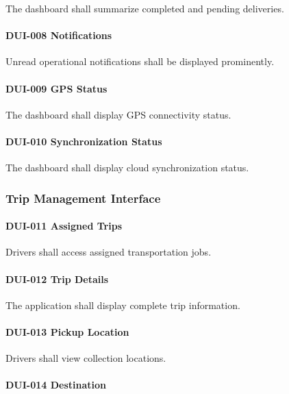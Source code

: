 The dashboard shall summarize completed and pending deliveries.

\paragraph{DUI-008 Notifications}

Unread operational notifications shall be displayed prominently.

\paragraph{DUI-009 GPS Status}

The dashboard shall display GPS connectivity status.

\paragraph{DUI-010 Synchronization Status}

The dashboard shall display cloud synchronization status.


\subsubsection*{Trip Management Interface}

\paragraph{DUI-011 Assigned Trips}

Drivers shall access assigned transportation jobs.

\paragraph{DUI-012 Trip Details}

The application shall display complete trip information.

\paragraph{DUI-013 Pickup Location}

Drivers shall view collection locations.

\paragraph{DUI-014 Destination}

